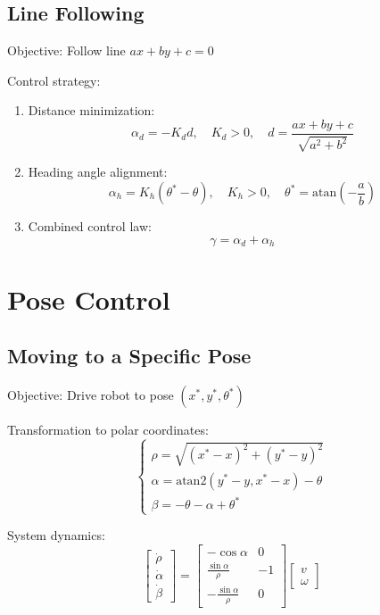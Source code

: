 \documentclass[openany]{book}
\theoremstyle{definition}
\theoremstyle{remark}
\begin{document}
\subsection{Line Following}
Objective: Follow line $ax + by + c = 0$

Control strategy:
\begin{enumerate}
    \item Distance minimization:
        \begin{equation}
            \alpha_d = -K_d d, \quad K_d > 0, \quad d = \frac{ax + by + c}{\sqrt{a^2 + b^2}}
        \end{equation}
    
    \item Heading angle alignment:
        \begin{equation}
            \alpha_h = K_h(\theta^* - \theta), \quad K_h > 0, \quad \theta^* = \text{atan}\left(-\frac{a}{b}\right)
        \end{equation}
    
    \item Combined control law:
        \begin{equation}
            \gamma = \alpha_d + \alpha_h
        \end{equation}
\end{enumerate}

\section{Pose Control}

\subsection{Moving to a Specific Pose}
Objective: Drive robot to pose $(x^*, y^*, \theta^*)$

Transformation to polar coordinates:
\begin{equation}
    \begin{cases}
        \rho = \sqrt{(x^* - x)^2 + (y^* - y)^2} \\
        \alpha = \text{atan2}(y^* - y, x^* - x) - \theta \\
        \beta = -\theta - \alpha + \theta^*
    \end{cases}
\end{equation}

System dynamics:
\begin{equation}
    \begin{bmatrix}
        \dot{\rho} \\
        \dot{\alpha} \\
        \dot{\beta}
    \end{bmatrix} = 
    \begin{bmatrix}
        -\cos\alpha & 0 \\
        \frac{\sin\alpha}{\rho} & -1 \\
        -\frac{\sin\alpha}{\rho} & 0
    \end{bmatrix}
    \begin{bmatrix}
        v \\ \omega
    \end{bmatrix}
\end{equation}
\end{document}

